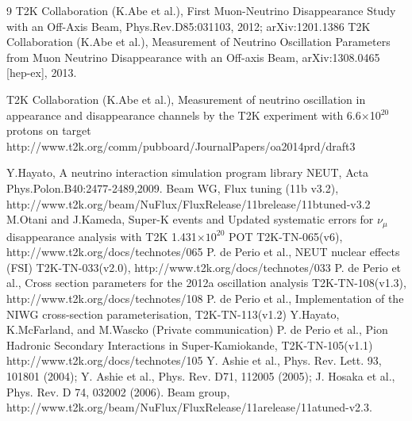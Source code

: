 \begin{thebibliography}{9}
%
%
   T2K Collaboration (K.Abe et al.), 
   First Muon-Neutrino Disappearance Study with an Off-Axis Beam,
   Phys.Rev.D85:031103, 2012; arXiv:1201.1386
  T2K Collaboration (K.Abe et al.),
  Measurement of Neutrino Oscillation Parameters from Muon Neutrino Disappearance with an Off-axis Beam,
  arXiv:1308.0465 [hep-ex], 2013.
  
%
%
   T2K Collaboration (K.Abe et al.),
   Measurement of neutrino oscillation in appearance and disappearance channels by the T2K experiment with 
   6.6$\times$10$^{20}$ protons on target 
   http://www.t2k.org/comm/pubboard/JournalPapers/oa2014prd/draft3

%
%
  Y.Hayato, A neutrino interaction simulation program library NEUT,
  Acta Phys.Polon.B40:2477-2489,2009.
   Beam WG, Flux tuning (11b v3.2), http://www.t2k.org/beam/NuFlux/FluxRelease/11brelease/11btuned-v3.2
   M.Otani and J.Kameda,
   Super-K events and Updated systematic errors for $\nu_\mu$ disappearance analysis with T2K 1.431$\times10^{20}$ POT
   T2K-TN-065(v6),
   http://www.t2k.org/docs/technotes/065
  P. de Perio et al.,
  NEUT nuclear effects (FSI)
  T2K-TN-033(v2.0),
  http://www.t2k.org/docs/technotes/033
  P. de Perio et al.,
  Cross section parameters for the 2012a oscillation analysis
  T2K-TN-108(v1.3),
  http://www.t2k.org/docs/technotes/108
  P. de Perio et al.,
  Implementation of the NIWG cross-section parameterisation,
  T2K-TN-113(v1.2) 
  Y.Hayato, K.McFarland, and M.Wascko (Private communication) 
  P. de Perio et al.,
  Pion Hadronic Secondary Interactions in Super-Kamiokande,
  T2K-TN-105(v1.1)
  http://www.t2k.org/docs/technotes/105
  Y. Ashie et al., Phys. Rev. Lett. 93, 101801 (2004);
  Y. Ashie et al., Phys. Rev. D71, 112005 (2005); 
  J. Hosaka et al., Phys. Rev. D 74, 032002 (2006).
  Beam group,
  http://www.t2k.org/beam/NuFlux/FluxRelease/11arelease/11atuned-v2.3.


\end{thebibliography}
